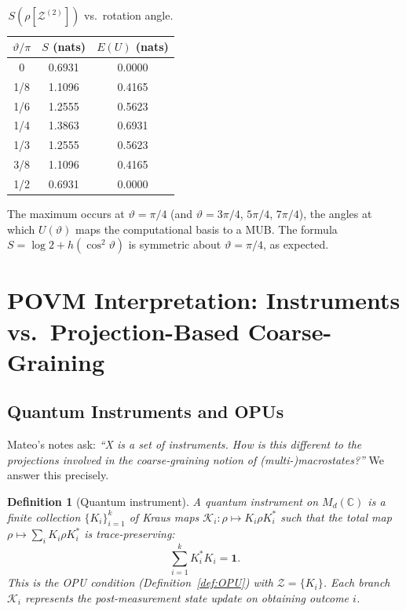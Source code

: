 \documentclass[12pt,a4paper]{article}
\newtheorem{definition}[theorem]{Definition}
\begin{document}
\begin{table}[h]
\centering
\caption{$S(\rho[\mathcal{Z}^{(2)}])$ vs.\ rotation angle.}
\label{tab:angle}
\begin{tabular}{c|c|c}
$\vartheta/\pi$ & $S$ (nats) & $E(U)$ (nats) \\ \hline
0     & 0.6931 & 0.0000 \\
1/8   & 1.1096 & 0.4165 \\
1/6   & 1.2555 & 0.5623 \\
1/4   & 1.3863 & 0.6931 \\
1/3   & 1.2555 & 0.5623 \\
3/8   & 1.1096 & 0.4165 \\
1/2   & 0.6931 & 0.0000
\end{tabular}
\end{table}

The maximum occurs at $\vartheta=\pi/4$ (and $\vartheta=3\pi/4$, $5\pi/4$,
$7\pi/4$), the angles at which $U(\vartheta)$ maps the computational basis
to a MUB.  The formula $S=\log 2+h(\cos^2\vartheta)$ is symmetric about
$\vartheta=\pi/4$, as expected.

\section{POVM Interpretation: Instruments vs.\ Projection-Based Coarse-Graining}
\label{sec:povm}

\subsection{Quantum Instruments and OPUs}

Mateo's notes ask: \emph{``X is a set of instruments.  How is this different to the
projections involved in the coarse-graining notion of (multi-)macrostates?''}  We
answer this precisely.

\begin{definition}[Quantum instrument]
A \emph{quantum instrument} on $M_d(\mathbb{C})$ is a finite collection
$\{K_i\}_{i=1}^k$ of Kraus maps $\mathcal{K}_i:\rho\mapsto K_i\rho K_i^*$ such
that the total map $\rho\mapsto\sum_i K_i\rho K_i^*$ is trace-preserving:
\[
  \sum_{i=1}^k K_i^*K_i = \mathbf{1}.
\]
This is the OPU condition (Definition~\ref{def:OPU}) with $\mathcal{Z}=\{K_i\}$.
Each branch $\mathcal{K}_i$ represents the post-measurement state update on
obtaining outcome $i$.
\end{definition}
\end{document}
